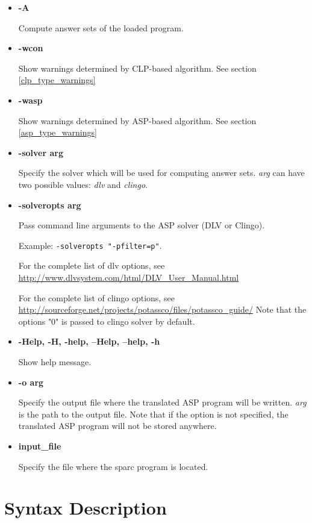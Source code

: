 \documentclass[12pt, letterpaper]{article}
\begin{document}
\begin{itemize}
 \item \textbf{-A}
    
  Compute answer sets of the loaded program.

\item \textbf{-wcon}
    
  Show warnings determined by CLP-based algorithm. See section \ref{clp_type_warnings}

\item \textbf{-wasp}
    
  Show warnings determined by ASP-based algorithm. See section \ref{asp_type_warnings}

\item \textbf{-solver arg}

  Specify the solver which will be used for computing answer sets. \textit{arg} can have two possible values: \textit{dlv} and \textit{clingo}. 
\item \textbf{-solveropts arg}

  Pass command line arguments to the ASP solver (DLV or Clingo).
  
  Example: \texttt{-solveropts "-pfilter=p"}.


  For the complete list of dlv options, see 
  {\scriptsize
  \url{http://www.dlvsystem.com/html/DLV_User_Manual.html }
}

  For the complete list of clingo options, see 
 {\scriptsize
  \url{http://sourceforge.net/projects/potassco/files/potassco_guide/}
}
  Note that the options "0"  is passed to clingo solver by default.

\item \textbf{-Help, -H, -help, --Help, --help, -h}

  Show help message.

\item \textbf{-o arg}

  Specify the output file where the translated ASP program will be written. \textit{arg} is the path to the output file. 
  Note that if the option is not specified, the translated ASP program will not be stored anywhere.

\item \textbf{input\_file}
  
Specify the file where the sparc program is located.



\end{itemize}


\section{Syntax Description}
\end{document}
